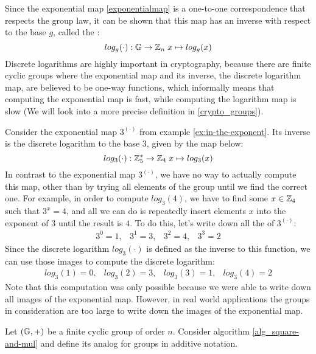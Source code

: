 Since the exponential map \eqref{exponentialmap} is a one-to-one correspondence that respects the group law, it can be shown that this map has an inverse with respect to the base $g$, called the :
\begin{equation}
\label{logarithm_map}
log_g(\cdot): \mathbb{G} \to \mathbb{Z}_n\; x \mapsto log_g(x)
\end{equation}
Discrete logarithms are highly important in cryptography, because there are finite cyclic groups where the exponential map and its inverse, the discrete logarithm map, are believed to be one-way functions, which informally means that computing the exponential map is fast, while computing the logarithm map is slow (We will look into a more precise definition in \ref{crypto_groups}).
\begin{example}Consider the exponential map $3^{(\cdot)}$ from example \ref{ex:in-the-exponent}. Its inverse is the discrete logarithm to the base $3$, given by the map below:
$$
log_3(\cdot): \mathbb{Z}_5^* \to \mathbb{Z}_4\; x \mapsto log_3(x)
$$ 
In contrast to the exponential map $3^{(\cdot)}$, we have no way to actually compute this map, other than by trying all elements of the group until we find the correct one. For example, in order to compute $log_3(4)$, we have to find some $x\in \mathbb{Z}_4$ such that $3^x=4$, and all we can do is repeatedly insert elements $x$ into the exponent of $3$ until the result is $4$. To do this, let's write down all the  of $3^{(\cdot)}$: 
$$
\begin{array}{cccc}
3^0 = 1, & 3^1 = 3, & 3^2 = 4, & 3^3 = 2
\end{array}
$$
Since the discrete logarithm $log_3(\cdot)$ is defined as the inverse to this function, we can use those images to compute the discrete logarithm:
$$
\begin{array}{ccccc}
log_3(1) = 0, & log_3(2) = 3, & log_3(3) = 1, & log_3(4) = 2
\end{array}
$$
Note that this computation was only possible because we were able to write down all images of the exponential map. However, in real world applications the groups in consideration are too large to write down the images of the exponential map. 
\end{example}
\begin{exercise}
\label{alg_double-and-add} Let $(\mathbb{G},+)$ be a finite cyclic group of order $n$. Consider algorithm \ref{alg_square-and-mul} and define its analog for groups in additive notation.
\end{exercise}


